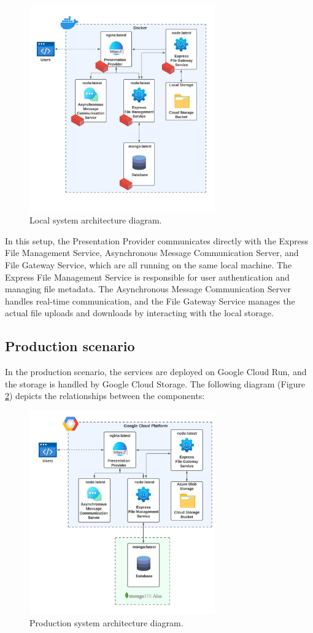\documentclass[a4paper,fleqn]{cas-dc}
\begin{document}
\begin{figure}[h]
\centering
\includegraphics[width=8cm]{architectureLocal.jpeg}
\caption{Local system architecture diagram.}
\label{fig:architectureLocal}
\end{figure}

In this setup, the Presentation Provider communicates directly with the Express File Management Service, Asynchronous Message Communication Server, and File Gateway Service, which are all running on the same local machine. The Express File Management Service is responsible for user authentication and managing file metadata. The Asynchronous Message Communication Server handles real-time communication, and the File Gateway Service manages the actual file uploads and downloads by interacting with the local storage.

\subsection{Production scenario}
In the production scenario, the services are deployed on Google Cloud Run, and the storage is handled by Google Cloud Storage. The following diagram (Figure \ref{fig:architectureProd}) depicts the relationships between the components:

\begin{figure}[h]
\centering
\includegraphics[width=8cm]{architectureProd.jpeg}
\caption{Production system architecture diagram.}
\label{fig:architectureProd}
\end{figure}
\end{document}
